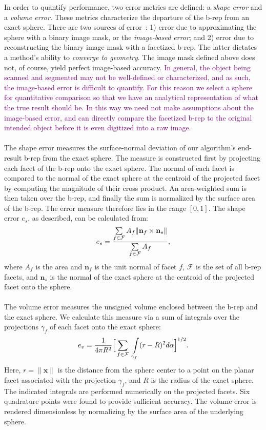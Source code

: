 In order to quantify performance, two error metrics are defined: a {\em shape error} and a {\em volume error}. These metrics characterize the departure of the b-rep from an exact sphere. There are two sources of error~\cite{young_2008}: 1) error due to approximating the sphere with a binary image mask, or the {\em image-based error}; and 2) error due to reconstructing the binary image mask with a facetized b-rep. The latter dictates a method's ability to {\em converge to geometry}. The image mask defined above does not, of course, yield perfect image-based accuracy. \textcolor{purple}{In general, the object being scanned and segmented may not be well-defined or characterized, and as such, the image-based error is difficult to quantify. For this reason we select a sphere for quantitative comparison so that we have an analytical representation of what the true result should be. In this way we need not make assumptions about the image-based error, and can directly compare the facetized b-rep to the original intended object before it is even digitized into a raw image.} \\ \\
%
The shape error measures the surface-normal deviation of our algorithm's end-result b-rep from the exact sphere. The measure is constructed first by projecting each facet of the b-rep onto the exact sphere. The normal of each facet is compared to the normal of the exact sphere at the centroid of the projected facet by computing the magnitude of their cross product. An area-weighted sum is then taken over the b-rep, and finally the sum is normalized by the surface area of the b-rep. The error measure therefore lies in the range $\left [0,1\right]$. The shape error $e_s$, as described, can be calculated from:
\begin{equation} 
	e_s = \frac{ \sum \limits_{f\in\mathcal{F}} A_f \lVert {\bf n}_f \times {\bf n}_s \rVert}{\sum \limits_{f\in\mathcal{F}} A_f},
\end{equation}
where $A_f$ is the area and ${\bm n}_f$ is the unit normal of facet $f$, $\mathcal{F}$ is the set of all b-rep facets, and ${\bm n}_s$ is the normal of the exact sphere at the centroid of the projected facet onto the sphere. \\ \\
%
The volume error measures the unsigned volume enclosed between the b-rep and the exact sphere. We calculate this measure via a sum of integrals over the projections $\gamma_f$ of each facet onto the exact sphere: 
\begin{equation}
\label{vol err}
	e_v = \frac{1}{4\pi R^2} \Big[\sum \limits_{f \in \mathcal{F}\textsl{}} \ \int \limits_{\gamma_f} (r - R)^2 d\alpha \Big]^{1/2} .
\end{equation}
Here, $r = \lVert {\bm x} \rVert$ is the distance from the sphere center to a point on the planar facet associated with the projection $\gamma_f$, and $R$ is the radius of the exact sphere.  The indicated integrals are performed numerically on the projected facets. Six quadrature points were found to provide sufficient accuracy. The volume error is rendered dimensionless by normalizing by the surface area of the underlying sphere.
